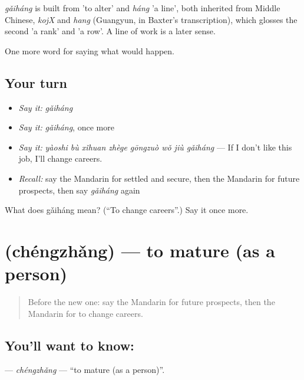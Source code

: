 \begin{cousinweb}
\emph{gǎiháng} is built from  'to alter' and \emph{háng} 'a line', both inherited from Middle Chinese, \emph{kojX} and \emph{hang} (Guangyun, in Baxter's transcription), which glosses the second 'a rank' and 'a row'. A line of work is a later sense.
\end{cousinweb}

\begin{grammarlens}[title={What you've built}]
One more word for saying what would happen.
\end{grammarlens}

\subsection*{Your turn}
\begin{itemize}
\raggedright
  \item \emph{Say it:} \emph{gǎiháng}
  \item \emph{Say it:} \emph{gǎiháng}, once more
  \item \emph{Say it:} \emph{yàoshi bù xǐhuan zhège gōngzuò wǒ jiù gǎiháng} — If I don't like this job, I'll change careers.
  \item \emph{Recall:} say the Mandarin for settled and secure, then the Mandarin for future prospects, then say \emph{gǎiháng} again
\end{itemize}

\begin{tcolorbox}[breakable,colback=teal!4,colframe=teal!35!black,title={Before you move on}]
What does gǎiháng mean? (\textquotedblleft{}To change careers\textquotedblright{}.) Say it once more.
\end{tcolorbox}
\section[\texorpdfstring{\zh{成长} (chéngzhǎng)}{成长 (chéngzhǎng)}]{ (chéngzhǎng) — to mature (as a person)}

\label{lesson:ZH-C401-chengzhang}



\begin{quote}
Before the new one: say the Mandarin for future prospects, then the Mandarin for to change careers.
\end{quote}

\subsection*{You'll want to know: }
\textbf{} — \emph{chéngzhǎng} — \textquotedblleft{}to mature (as a person)\textquotedblright{}.

